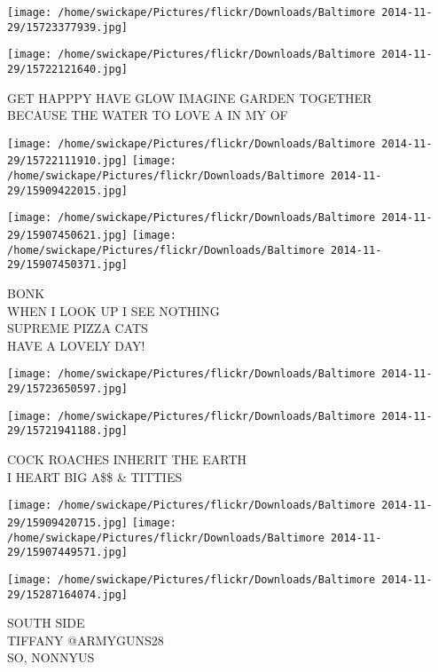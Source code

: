 \documentclass[10pt,letterpaper]{article}
\begin{document}
\texttt{[image: /home/swickape/Pictures/flickr/Downloads/Baltimore 2014-11-29/15723377939.jpg]}

\vspace{0.25in}
\texttt{[image: /home/swickape/Pictures/flickr/Downloads/Baltimore 2014-11-29/15722121640.jpg]}

GET HAPPPY HAVE GLOW IMAGINE GARDEN TOGETHER\\
BECAUSE THE WATER TO LOVE A IN MY OF\\
\pagebreak

\texttt{[image: /home/swickape/Pictures/flickr/Downloads/Baltimore 2014-11-29/15722111910.jpg]}
\texttt{[image: /home/swickape/Pictures/flickr/Downloads/Baltimore 2014-11-29/15909422015.jpg]}

\texttt{[image: /home/swickape/Pictures/flickr/Downloads/Baltimore 2014-11-29/15907450621.jpg]}
\texttt{[image: /home/swickape/Pictures/flickr/Downloads/Baltimore 2014-11-29/15907450371.jpg]}

BONK\\
WHEN I LOOK UP I SEE NOTHING\\
SUPREME PIZZA CATS\\
HAVE A LOVELY DAY!\\
\pagebreak

\texttt{[image: /home/swickape/Pictures/flickr/Downloads/Baltimore 2014-11-29/15723650597.jpg]}

\vspace{0.25in}
\texttt{[image: /home/swickape/Pictures/flickr/Downloads/Baltimore 2014-11-29/15721941188.jpg]}

COCK ROACHES INHERIT THE EARTH\\
I HEART BIG A\$\$ \& TITTIES\\
\pagebreak

\texttt{[image: /home/swickape/Pictures/flickr/Downloads/Baltimore 2014-11-29/15909420715.jpg]}
\texttt{[image: /home/swickape/Pictures/flickr/Downloads/Baltimore 2014-11-29/15907449571.jpg]}

\vspace{0.25in}
\texttt{[image: /home/swickape/Pictures/flickr/Downloads/Baltimore 2014-11-29/15287164074.jpg]}

SOUTH SIDE\\
TIFFANY @ARMYGUNS28\\
SO, NONNYUS\\
\pagebreak
\end{document}
